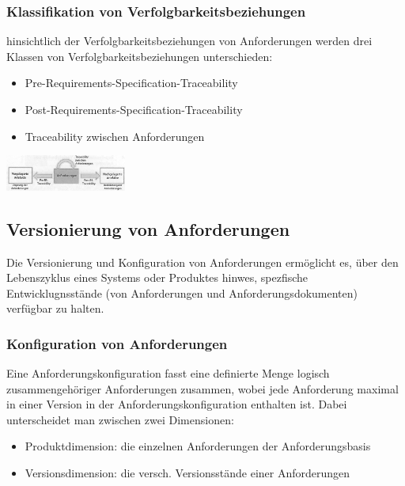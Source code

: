 \documentclass{report}
\newenvironment{Figure}
	{\par\medskip\noindent\minipage{\linewidth}}
	{\endminipage\par\medskip}
\theoremstyle{definition}
\theoremstyle{example}
\begin{document}
\subsubsection{Klassifikation von Verfolgbarkeitsbeziehungen}
hinsichtlich der Verfolgbarkeitsbeziehungen von Anforderungen werden drei Klassen von Verfolgbarkeitsbeziehungen unterschieden:
\begin{itemize}
   \item Pre-Requirements-Specification-Traceability
   \item Post-Requirements-Specification-Traceability
   \item Traceability zwischen Anforderungen
\end{itemize}

\begin{Figure}
   \centering
    \includegraphics[width=150px]{img/KlassifikationTraceability.png}
        \label{fig:Abbildung der Klassen der Traceability}
\end{Figure}

\subsection{Versionierung von Anforderungen}
Die Versionierung und Konfiguration von Anforderungen ermöglicht es, über den Lebenszyklus eines Systems oder Produktes hinwes, spezfische Entwicklugnsstände (von Anforderungen und Anforderungsdokumenten) verfügbar zu halten.

\subsubsection{Konfiguration von Anforderungen}
Eine Anforderungskonfiguration fasst eine definierte Menge logisch zusammengehöriger Anforderungen zusammen, wobei jede Anforderung maximal in einer Version in der Anforderungskonfiguration enthalten ist. Dabei unterscheidet man zwischen zwei Dimensionen:
\begin{itemize}
   \item Produktdimension: die einzelnen Anforderungen der Anforderungsbasis
   \item Versionsdimension: die versch. Versionsstände einer Anforderungen
\end{itemize}
\end{document}
